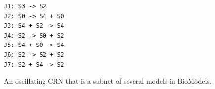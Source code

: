 \documentclass[webpdf,contemporary,large]{oup-authoring-template}
\theoremstyle{thmstyleone}%
\theoremstyle{thmstyletwo}%
\theoremstyle{thmstylethree}%
\begin{document}
\begin{figure}
\centering
{\tiny
\begin{verbatim}
J1: S3 -> S2
J2: S0 -> S4 + S0
J3: S4 + S2 -> S4
J4: S2 -> S0 + S2
J5: S4 + S0 -> S4
J6: S2 -> S2 + S2
J7: S2 + S4 -> S2
\end{verbatim}
}
\caption{An oscillating CRN that is a subnet of several models in BioModels.}\label{fig:generated-oscillator}
\end{figure}



\end{document}
